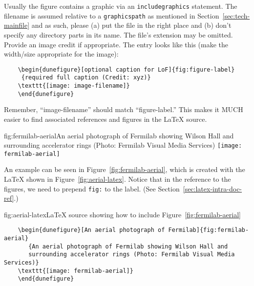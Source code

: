 Usually the figure contains a graphic via an \texttt{includegraphics} statement.
The filename is assumed relative to a \texttt{graphicspath} as
mentioned in Section~\ref{sec:tech-mainfile} and as such, please (a) put the file in the right place and (b) don't
 specify any directory parts in its name.
The file's extension may be omitted. Provide an image credit if appropriate. The entry looks like this (make the width/size appropriate for the image):

\begin{verbatim}
    \begin{dunefigure}[optional caption for LoF]{fig:figure-label}
     {required full caption (Credit: xyz)}
    \texttt{[image: image-filename]}
    \end{dunefigure}
\end{verbatim}

Remember, ``image-filename'' should match ``figure-label.'' This makes it MUCH easier to find associated references and figures in the \LaTeX{}  source. 

\begin{dunefigure}{fig:fermilab-aerial}{An aerial photograph of Fermilab
    showing Wilson Hall and surrounding accelerator rings (Photo: Fermilab
    Visual Media Services)}
  \texttt{[image: fermilab-aerial]}
\end{dunefigure}


An example can be seen in Figure~\ref{fig:fermilab-aerial}, which is created
with the \LaTeX{} shown in Figure~\ref{fig:aerial-latex}.  Notice that in the reference to the figures, we need to prepend \texttt{fig:} to the label. (See Section~\ref{sec:latex-intra-doc-ref}.)

\begin{dunefigure}{fig:aerial-latex}{\LaTeX{} source showing how to include Figure~\ref{fig:fermilab-aerial}}
\begin{verbatim}
    \begin{dunefigure}[An aerial photograph of Fermilab]{fig:fermilab-aerial}
       {An aerial photograph of Fermilab showing Wilson Hall and 
       surrounding accelerator rings (Photo: Fermilab Visual Media Services)}
    \texttt{[image: fermilab-aerial]}
    \end{dunefigure}
\end{verbatim}
\end{dunefigure}

